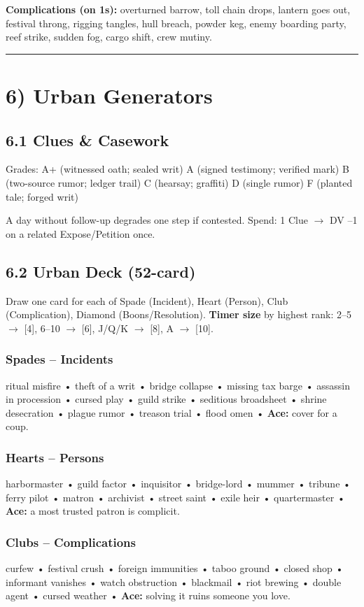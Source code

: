 \documentclass[11pt]{article}
\newcommand{\sectionrule}{\vspace{0.5em}\noindent\textcolor{gray}{\rule{\textwidth}{0.4pt}}\par\vspace{0.5em}}
\begin{document}
\textbf{Complications (on 1s):} overturned barrow, toll chain drops, lantern goes out, festival throng, rigging tangles, hull breach, powder keg, enemy boarding party, reef strike, sudden fog, cargo shift, crew mutiny.

\sectionrule

\section*{6) Urban Generators}
\subsection*{6.1 Clues \& Casework}
Grades:  
A+ (witnessed oath; sealed writ)  
A (signed testimony; verified mark)  
B (two-source rumor; ledger trail)  
C (hearsay; graffiti)  
D (single rumor)  
F (planted tale; forged writ)  

A day without follow-up degrades one step if contested.  
Spend: 1 Clue $\rightarrow$ DV --1 on a related Expose/Petition once.

\subsection*{6.2 Urban Deck (52-card)}
Draw one card for each of Spade (Incident), Heart (Person), Club (Complication), Diamond (Boons/Resolution).  
\textbf{Timer size} by highest rank: 2--5 $\rightarrow$ [4], 6--10 $\rightarrow$ [6], J/Q/K $\rightarrow$ [8], A $\rightarrow$ [10].

\subsubsection*{Spades -- Incidents}
ritual misfire • theft of a writ • bridge collapse • missing tax barge • assassin in procession • cursed play • guild strike • seditious broadsheet • shrine desecration • plague rumor • treason trial • flood omen • \textbf{Ace:} cover for a coup.

\subsubsection*{Hearts -- Persons}
harbormaster • guild factor • inquisitor • bridge-lord • mummer • tribune • ferry pilot • matron • archivist • street saint • exile heir • quartermaster • \textbf{Ace:} a most trusted patron is complicit.

\subsubsection*{Clubs -- Complications}
curfew • festival crush • foreign immunities • taboo ground • closed shop • informant vanishes • watch obstruction • blackmail • riot brewing • double agent • cursed weather • \textbf{Ace:} solving it ruins someone you love.
\end{document}
